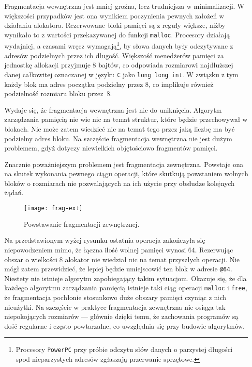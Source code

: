 \documentclass[12pt,a4paper,titlepage,twoside]{mwart}
\begin{document}
Fragmentacja wewnętrzna jest mniej groźna, lecz trudniejsza w minimalizacji. W
większości przypadków jest ona wynikiem poczynienia pewnych założeń w działaniu
alokatora. Rezerwowane bloki pamięci są z reguły większe, niżby wynikało to z
wartości przekazywanej do funkcji \texttt{malloc}. Procesory działają
wydajniej, a czasami wręcz wymagają\footnote{Procesory \texttt{PowerPC} przy
próbie odczytu słów danych o parzystej długości spod nieparzystych adresów
zgłaszają przerwanie sprzętowe.}, by słowa danych były odczytywane z adresów
podzielnych przez ich długość. Większość menedżerów pamięci za jednostkę
allokacji przyjmuje $8$ bajtów, co odpowiada rozmiarowi najdłuższej danej
całkowitej oznaczanej w języku \verb+C+ jako \verb+long long int+. W związku z
tym każdy blok ma adres początku podzielny przez $8$, co implikuje również 
podzielność rozmiaru bloku przez~$8$.

Wydaje się, że fragmentacja wewnętrzna jest nie do uniknięcia. Algorytm
zarządzania pamięcią nie wie nic na temat struktur, które będzie przechowywał w
blokach. Nie może zatem wiedzieć nic na temat tego przez jaką liczbę ma być
podzielny adres bloku. Na szczęście fragmentacja wewnętrzna nie jest dużym
problemem, gdyż dotyczy niewielkich objętościowo fragmentów pamięci.

Znacznie poważniejszym problemem jest fragmentacja zewnętrzna. Powstaje ona na
skutek wykonania pewnego ciągu operacji, które skutkują powstaniem wolnych
bloków o rozmiarach nie pozwalających na ich użycie przy obsłudze kolejnych
żądań.

\begin{figure}[ht]
\centering
\texttt{[image: frag-ext]}
\caption{Powstawanie fragmentacji zewnętrznej.}
\end{figure}

Na przedstawionym wyżej rysunku ostatnia operacja zakończyła się niepowodzeniem
mimo, że łączna ilość wolnej pamięci wynosi $64$. Rezerwując obszar o wielkości
$8$ alokator nie wiedział nic na temat przyszłych operacji. Nie mógł zatem
przewidzieć, że lepiej będzie umiejscowić ten blok w adresie \verb+@64+.
Niestety nie istnieje algorytm zapobiegający takim sytuacjom. Okazuje się, że
dla każdego algorytmu zarządzania pamięcią istnieje taki ciąg operacji
\texttt{malloc} i \texttt{free}, że fragmentacja pochłonie stosunkowo duże
obszary pamięci czyniąc z nich nieużytki. Na szczęście w praktyce fragmentacja
zewnętrzna nie osiąga tak niepokojących rozmiarów --- głównie dzięki temu, że
zachowania programów są dość regularne i często powtarzalne, co uwzględnia się
przy budowie algorytmów.
\end{document}
